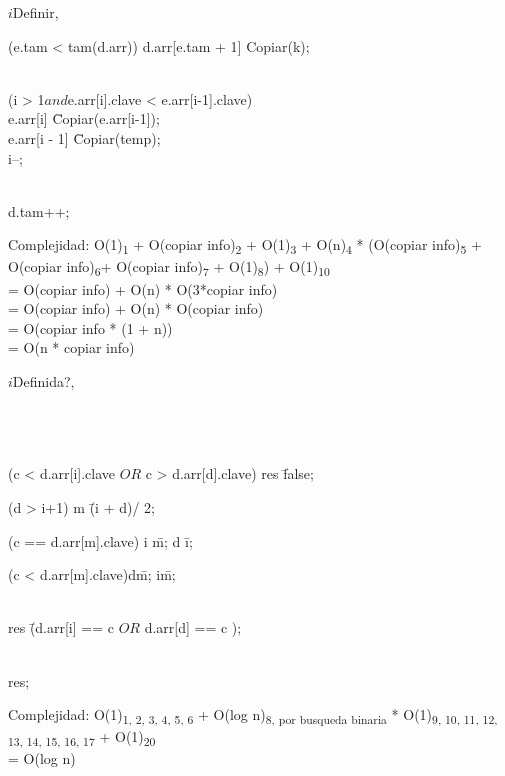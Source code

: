 	\begin{algorithm}{$i$Definir}{,  }{}
	\begin{IF}{(e.tam < tam(d.arr))}
	d.arr[e.tam + 1] \leftarrow Copiar(k);\\
	\\
	\begin{WHILE}{(i > 1$ and $e.arr[i].clave < e.arr[i-1].clave)}
	\\
	e.arr[i] \= Copiar(e.arr[i-1]);\\
	e.arr[i - 1] \= Copiar(temp);\\
	i--;
	\end{WHILE}\\
	d.tam++;
	\end{IF}
	\end{algorithm}
	Complejidad:  O(1)\textsubscript{1} + O(copiar info)\textsubscript{2} + O(1)\textsubscript{3} + O(n)\textsubscript{4} * (O(copiar info)\textsubscript{5} + O(copiar info)\textsubscript{6}+ O(copiar info)\textsubscript{7} + O(1)\textsubscript{8}) + O(1)\textsubscript{10}	\\
	= O(copiar info) + O(n) * O(3*copiar info) \\
	= O(copiar info) + O(n) * O(copiar info)	\\
	= O(copiar info * (1 + n)) \\
	= O(n * copiar info)
	 \\	


	\begin{algorithm}{$i$Definida?}{, }{}
	\\
	\\
	\\
	\\
	\begin{IF}{(c < d.arr[i].clave $ OR $ c > d.arr[d].clave)}
		res \= false;
	\ELSE\\
	\begin{WHILE}{(d > i+1)}
	m \= (i + d)/ 2;\\
	\begin{IF}{(c == d.arr[m].clave)}
		i \= m; d \= i;
	\ELSE \begin{IF}{(c < d.arr[m].clave)}d\=m;
	\ELSE i\=m;
	\end{IF}
	\end{IF}\\
	res \= (d.arr[i] == c $  OR  $ d.arr[d] == c );
	\end{WHILE}
	\end{IF}\\
	\RETURN res;
	\end{algorithm}
	Complejidad:  O(1)\textsubscript{1, 2, 3, 4, 5, 6} + O(log n)\textsubscript{8, por busqueda binaria} * O(1)\textsubscript{9, 10, 11, 12, 13, 14, 15, 16, 17} + O(1)\textsubscript{20}\\
	= O(log n)\\
	 \\
	
